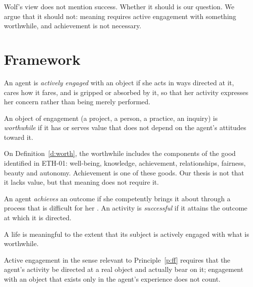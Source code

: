 \documentclass{situationist-preprint}
\begin{document}
Wolf's view does not mention success. Whether it should is our question. We argue that it should not: meaning requires active engagement with something worthwhile, and achievement is not necessary.

\section{Framework}

\begin{definition}\label{d:engage}
An agent is \emph{actively engaged} with an object if she acts in ways directed at it, cares how it fares, and is gripped or absorbed by it, so that her activity expresses her concern rather than being merely performed.
\end{definition}

\begin{definition}[Worthwhile]\label{d:worth}
An object of engagement (a project, a person, a practice, an inquiry) is \emph{worthwhile} if it has or serves value that does not depend on the agent's attitudes toward it.
\end{definition}

On Definition~\ref{d:worth}, the worthwhile includes the components of the good identified in ETH-01: well-being, knowledge, achievement, relationships, fairness, beauty and autonomy. Achievement is one of these goods. Our thesis is not that it lacks value, but that meaning does not require it.

\begin{definition}[Achievement]\label{d:ach}
An agent \emph{achieves} an outcome if she competently brings it about through a process that is difficult for her \citep{Bradford2015}. An activity is \emph{successful} if it attains the outcome at which it is directed.
\end{definition}

\begin{principle}\label{p:ff}
A life is meaningful to the extent that its subject is actively engaged with what is worthwhile.
\end{principle}

\begin{principle}\label{p:real}
Active engagement in the sense relevant to Principle~\ref{p:ff} requires that the agent's activity be directed at a real object and actually bear on it; engagement with an object that exists only in the agent's experience does not count.
\end{principle}
\end{document}
